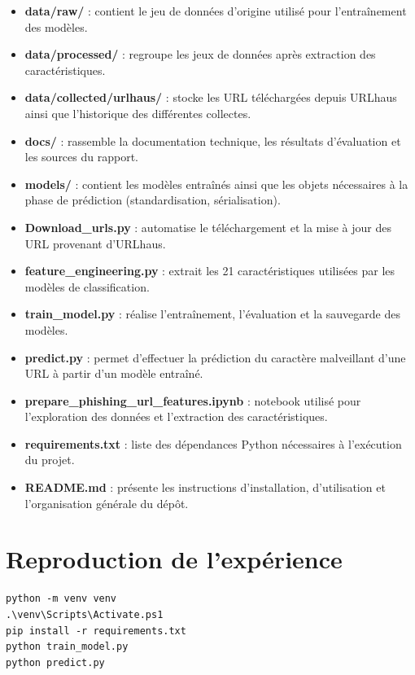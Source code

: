\documentclass[11pt,a4paper]{report}
\begin{document}
\begin{itemize}
    \item \textbf{data/raw/} : contient le jeu de données d'origine utilisé pour l'entraînement des modèles.
    \item \textbf{data/processed/} : regroupe les jeux de données après extraction des caractéristiques.
    \item \textbf{data/collected/urlhaus/} : stocke les URL téléchargées depuis URLhaus ainsi que l'historique des différentes collectes.
    \item \textbf{docs/} : rassemble la documentation technique, les résultats d'évaluation et les sources du rapport.
    \item \textbf{models/} : contient les modèles entraînés ainsi que les objets nécessaires à la phase de prédiction (standardisation, sérialisation).
    \item \textbf{Download\_urls.py} : automatise le téléchargement et la mise à jour des URL provenant d'URLhaus.
    \item \textbf{feature\_engineering.py} : extrait les 21 caractéristiques utilisées par les modèles de classification.
    \item \textbf{train\_model.py} : réalise l'entraînement, l'évaluation et la sauvegarde des modèles.
    \item \textbf{predict.py} : permet d'effectuer la prédiction du caractère malveillant d'une URL à partir d'un modèle entraîné.
    \item \textbf{prepare\_phishing\_url\_features.ipynb} : notebook utilisé pour l'exploration des données et l'extraction des caractéristiques.
    \item \textbf{requirements.txt} : liste des dépendances Python nécessaires à l'exécution du projet.
    \item \textbf{README.md} : présente les instructions d'installation, d'utilisation et l'organisation générale du dépôt.
\end{itemize}

\section{Reproduction de l'expérience}

\begin{lstlisting}[language={},caption={Installation et exécution sous Windows}]
python -m venv venv
.\venv\Scripts\Activate.ps1
pip install -r requirements.txt
python train_model.py
python predict.py
\end{lstlisting}
\end{document}
